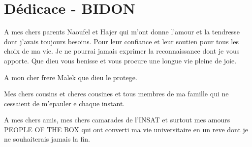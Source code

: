 \chapter*{Dédicace - BIDON}
\begin{spacing}{1.5}

A mes chers parents Naoufel et Hajer qui m'ont donne l'amour et la tendresse dont j'avais toujours besoins.
Pour leur confiance et leur soutien pour tous les choix de ma vie.
Je ne pourrai jamais exprimer la reconnaissance dont je vous apporte.
Que dieu vous benisse et vous procure une longue vie pleine de joie.

A mon cher frere Malek que dieu le protege.

Mes chers cousins et cheres cousines et tous membres de ma famille qui ne cessaient de m'epauler e chaque instant.

A mes chers amis, mes chers camarades de l'INSAT et surtout mes amours PEOPLE OF THE BOX qui ont converti ma vie universitaire en un reve dont je ne souhaiterais jamais la fin.

\end{spacing} 